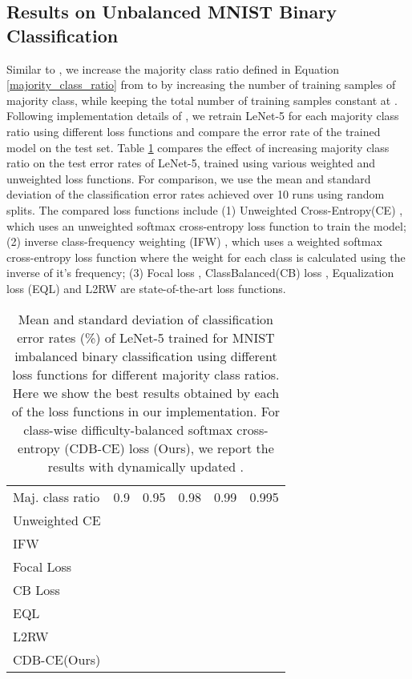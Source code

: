 \documentclass[runningheads]{llncs}
\begin{document}
\subsection{Results on Unbalanced MNIST Binary Classification}
\label{MNIST_results}
Similar to \cite{reweighting_examples}, we increase the majority class ratio defined in Equation 
\ref{majority_class_ratio} from
 to  by increasing the number of training samples of majority class, 
while
keeping the total number of training samples constant at . Following 
implementation details of \cite{reweighting_examples}, we retrain LeNet-5 \cite{LeNet} for each majority class 
ratio using different loss functions and compare the error rate of the trained 
model on the
test set. Table \ref{table:MNIST1} compares the effect of increasing majority class ratio on the 
test error rates of LeNet-5, trained using various weighted and unweighted loss 
functions.
For comparison, we use the mean and standard deviation of the classification 
error
rates achieved over 10 runs using random splits. The compared loss functions 
include (1) Unweighted Cross-Entropy(CE) , which uses an unweighted softmax 
cross-entropy loss function to train the model; (2) inverse class-frequency 
weighting (IFW) \cite{Inverse_freq2}, which uses a weighted softmax cross-entropy loss function where the weight 
for
each class is calculated using the inverse of it’s frequency; (3) Focal loss \cite{FOCALloss}, ClassBalanced(CB) loss \cite{Class_balancedloss}, Equalization loss (EQL) \cite{Equalizationloss} and L2RW \cite{reweighting_examples} are
state-of-the-art loss functions.
\setlength{\tabcolsep}{4pt}
\begin{table}[t!]
\begin{center}
\caption{
Mean and standard deviation of classification error rates (\%) of LeNet-5 
\cite{LeNet} trained
for MNIST \cite{MNIST_data} imbalanced binary classification using different 
loss functions for different majority class ratios. Here we show the best 
results obtained by each of the loss functions in our
implementation. For class-wise difficulty-balanced softmax cross-entropy (CDB-CE) loss (Ours), we report the results with dynamically updated .
}
\label{table:MNIST1}
\begin{tabular}{llllll}
\hline\noalign{\smallskip}
Maj. class ratio & 0.9 & 0.95 & 0.98 & 0.99 & 0.995\\
\noalign{\smallskip}
\hline
\noalign{\smallskip}
Unweighted CE & &  &  &  & \\
IFW \cite{Inverse_freq2}  & &  &  &  & \\
Focal Loss \cite{FOCALloss}  & &  &  &  & \\
CB Loss \cite{Class_balancedloss}& &  &  &  & \\
EQL \cite{Equalizationloss} & &  &  &  & \\
L2RW \cite{reweighting_examples} & &  &  &  & \\
CDB-CE(Ours) & &  &  &  & \\
\hline
\end{tabular}
\end{center}
\end{table}
\setlength{\tabcolsep}{1.4pt}
\end{document}
